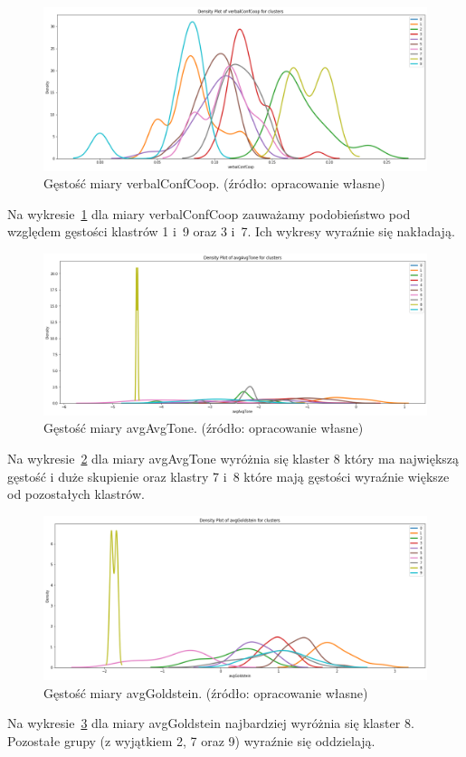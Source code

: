 \documentclass[11pt]{report}
\begin{document}
    \begin{figure}[!htp]
        \centering
        \includegraphics[width=\linewidth]{fig/CLUST/density_verbalConfCoop.png}
        \caption{Gęstość miary verbalConfCoop. (źródło: opracowanie własne)}
        \label{fig:density_verbalconfcoop}
    \end{figure}
    Na wykresie~\ref{fig:density_verbalconfcoop} dla miary verbalConfCoop zauważamy podobieństwo pod względem gęstości klastrów 1 i~9 oraz 3 i~7.
    Ich wykresy wyraźnie się nakładają.

    \begin{figure}[!htp]
        \centering
        \includegraphics[width=\linewidth]{fig/CLUST/density_avgAvgTone.png}
        \caption{Gęstość miary avgAvgTone. (źródło: opracowanie własne)}
        \label{fig:density_avgavgtone}
    \end{figure}
    Na wykresie~\ref{fig:density_avgavgtone} dla miary avgAvgTone wyróżnia się klaster 8 który ma największą gęstość i duże skupienie oraz klastry 7 i~8 które mają gęstości wyraźnie większe od pozostałych klastrów.

    \begin{figure}[!htp]
        \centering
        \includegraphics[width=\linewidth]{fig/CLUST/density_avgGoldstein.png}
        \caption{Gęstość miary avgGoldstein. (źródło: opracowanie własne)}
        \label{fig:density_avggoldstein}
    \end{figure}
    Na wykresie~\ref{fig:density_avggoldstein} dla miary avgGoldstein najbardziej wyróżnia się klaster 8.
    Pozostałe grupy (z wyjątkiem 2, 7 oraz 9) wyraźnie się oddzielają.
\end{document}
